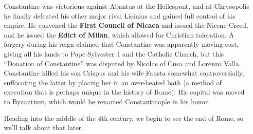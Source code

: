 Constantine was victorious against Abantus at the Hellespont,
and at Chrysopolis he finally defeated his other major rival Licinius and gained full control of his empire.
He convened the \textbf{First Council of Nicaea} and issued the Nicene Creed,
and he issued the \textbf{Edict of Milan}, which allowed for Christian toleration.
A forgery during his reign claimed that Constantine was apparently moving east,
giving all his lands to Pope Sylvester~I and the Catholic Church,
but this ``Donation of Constantine'' was disputed by Nicolas of Cusa and Lorenzo Valla.
Constantine killed his son Crispus and his wife Fausta somewhat controversially,
suffocating the latter by placing her in an over-heated bath
(a method of execution that is perhaps unique in the history of Rome).
His capital was moved to Byzantium, which would be renamed Constantinople in his honor.

Heading into the middle of the 4th century, we begin to see the end of Rome, so we'll talk about that later.
